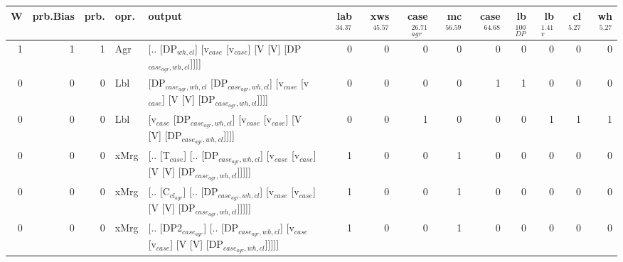 \begin{tabularx}{\linewidth}{rrrlXrrrrrrrrr}
\hline
   W &   prb.Bias &   prb. & opr.   & output                                                                                                                    &   lab$^{34.37}$ &   xws$^{45.57}$ &   case$_{agr}^{26.71}$ &   mc$^{56.59}$ &   case$^{64.68}$ &   lb$_{DP}^{100}$ &   lb$_{v}^{1.41}$ &   cl$^{5.27}$ &   wh$^{5.27}$ \\
\hline
   1 &       1 &   1 & Agr  & [.. [DP$_{wh,cl}$] [v$_{case}$ [v$_{case}$] [V [V] [DP$_{case_{agr},wh,cl}$]]]]                                                             &             0 &             0 &                  0 &            0 &              0 &                0 &             0 &        0 &        0 \\
   0 &       0 &   0 & Lbl  & [DP$_{case_{agr},wh,cl}$ [DP$_{case_{agr},wh,cl}$] [v$_{case}$ [v$_{case}$] [V [V] [DP$_{case_{agr},wh,cl}$]]]]                                     &             0 &             0 &                  0 &            0 &              1 &                1 &             0 &        0 &        0 \\
   0 &       0 &   0 & Lbl  & [v$_{case}$ [DP$_{case_{agr},wh,cl}$] [v$_{case}$ [v$_{case}$] [V [V] [DP$_{case_{agr},wh,cl}$]]]]                                                &             0 &             0 &                  1 &            0 &              0 &                0 &             1 &        1 &        1 \\
   0 &       0 &   0 & xMrg & [.. [T$_{case}$] [.. [DP$_{case_{agr},wh,cl}$] [v$_{case}$ [v$_{case}$] [V [V] [DP$_{case_{agr},wh,cl}$]]]]]                                      &             1 &             0 &                  0 &            1 &              0 &                0 &             0 &        0 &        0 \\
   0 &       0 &   0 & xMrg & [.. [C$_{cl_{agr}}$] [.. [DP$_{case_{agr},wh,cl}$] [v$_{case}$ [v$_{case}$] [V [V] [DP$_{case_{agr},wh,cl}$]]]]]                                    &             1 &             0 &                  0 &            1 &              0 &                0 &             0 &        0 &        0 \\
   0 &       0 &   0 & xMrg & [.. [DP2$_{case_{agr}}$] [.. [DP$_{case_{agr},wh,cl}$] [v$_{case}$ [v$_{case}$] [V [V] [DP$_{case_{agr},wh,cl}$]]]]]                                &             1 &             0 &                  0 &            1 &              0 &                0 &             0 &        0 &        0 \\

\end{tabularx}
